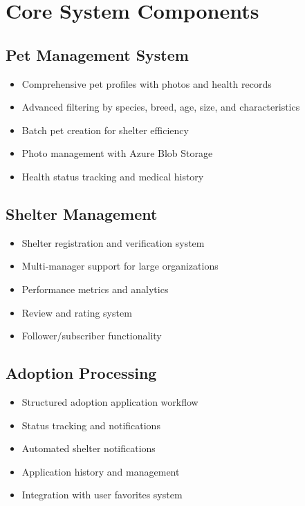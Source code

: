 \documentclass[12pt,a4paper]{article}
\begin{document}
\section{Core System Components}

\subsection{Pet Management System}

\begin{tcolorbox}[colback=lightgray, colframe=primaryblue, title=Key Features]
    \begin{itemize}
        \item Comprehensive pet profiles with photos and health records
        \item Advanced filtering by species, breed, age, size, and characteristics
        \item Batch pet creation for shelter efficiency
        \item Photo management with Azure Blob Storage
        \item Health status tracking and medical history
    \end{itemize}
\end{tcolorbox}

\subsection{Shelter Management}

\begin{itemize}
    \item Shelter registration and verification system
    \item Multi-manager support for large organizations
    \item Performance metrics and analytics
    \item Review and rating system
    \item Follower/subscriber functionality
\end{itemize}

\subsection{Adoption Processing}

\begin{itemize}
    \item Structured adoption application workflow
    \item Status tracking and notifications
    \item Automated shelter notifications
    \item Application history and management
    \item Integration with user favorites system
\end{itemize}
\end{document}
